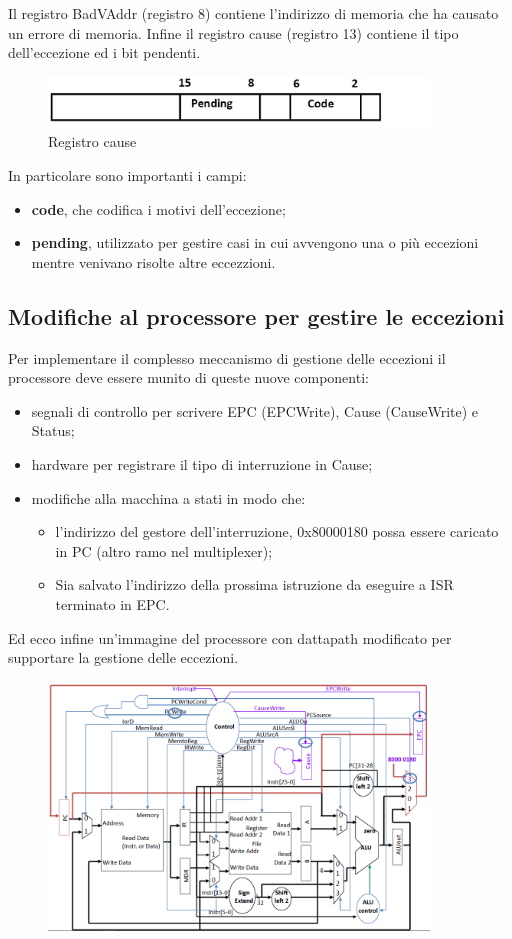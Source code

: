 \documentclass[class=book, crop=false, oneside]{standalone}
\begin{document}
Il registro BadVAddr (registro 8) contiene l'indirizzo di memoria che ha causato un errore di memoria.
Infine il registro cause (registro 13) contiene il tipo dell’eccezione ed i bit pendenti.

\begin{figure}[H]
	\centering
	\includegraphics[width=0.9\textwidth,keepaspectratio]{registro-cause}
	\caption{Registro cause}
\end{figure}

In particolare sono importanti i campi:
\begin{itemize}
	\item \textbf{code}, che codifica i motivi dell'eccezione;
	\item \textbf{pending}, utilizzato per gestire casi in cui avvengono una o più eccezioni mentre venivano risolte altre eccezzioni.
\end{itemize}

\subsection{Modifiche al processore per gestire le eccezioni}
Per implementare il complesso meccanismo di gestione delle eccezioni il processore deve essere munito di queste nuove componenti:
\begin{itemize}
	\item segnali di controllo per scrivere EPC (EPCWrite), Cause (CauseWrite) e Status;
	\item hardware per registrare il tipo di interruzione in Cause;
	\item modifiche alla macchina a stati in modo che:
	\begin{itemize}
		\item l’indirizzo del gestore dell’interruzione, 0x80000180  possa essere caricato in PC (altro ramo nel multiplexer);
		\item Sia salvato l’indirizzo della prossima istruzione da eseguire a ISR terminato in EPC.
	\end{itemize}
\end{itemize}

Ed ecco infine un'immagine del processore con dattapath modificato per supportare la gestione delle eccezioni.

\begin{figure}[H]
	\centering
	\includegraphics[width=0.9\textwidth,keepaspectratio]{final-datapath}
\end{figure}
\end{document}
